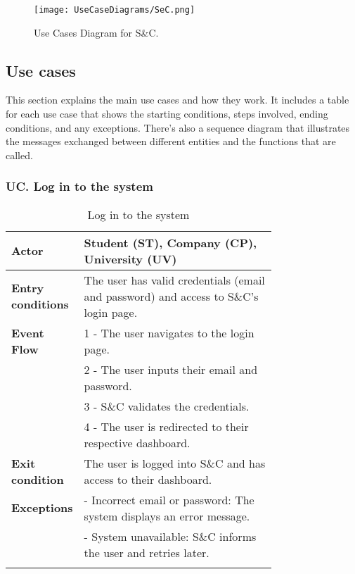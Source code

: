 \begin{figure}[H]
    \begin{center}
        \texttt{[image: UseCaseDiagrams/SeC.png]}
        \caption{Use Cases Diagram for S\&C.} 
        \label{fig:SeCUC}%
    \end{center}
\end{figure}

\newpage
\subsection{Use cases}
\label{subsec: use_cases}%
\setcounter{uc}{1}
\newcommand{\cuc}{\theuc\stepcounter{uc}}
This section explains the main use cases and how they work. It includes a table for each use case that shows the starting conditions, steps involved, ending conditions, and any exceptions. There's also a sequence diagram that illustrates the messages exchanged between different entities and the functions that are called. \\

\subsubsection*{UC\cuc . Log in to the system}
\begin{center}
    \begin{longtable}{|l|p{0.75\linewidth}|}
        \hline
        \textbf{Actor}            & Student (ST), Company (CP), University (UV) \\
        \hline
        \textbf{Entry conditions} & The user has valid credentials (email and password) and access to S\&C's login page. \\
        \hline
        \textbf{Event Flow}       & 1 - The user navigates to the login page. \\
                                  & 2 - The user inputs their email and password. \\
                                  & 3 - S\&C validates the credentials. \\
                                  & 4 - The user is redirected to their respective dashboard. \\
        \hline
        \textbf{Exit condition}   & The user is logged into S\&C and has access to their dashboard. \\       
        \hline
        \textbf{Exceptions}       & - Incorrect email or password: The system displays an error message. \\
                                  & - System unavailable: S\&C informs the user and retries later. \\
        \hline
        \caption{Log in to the system}
        \label{tab:login_usecase}
    \end{longtable}
\end{center}

